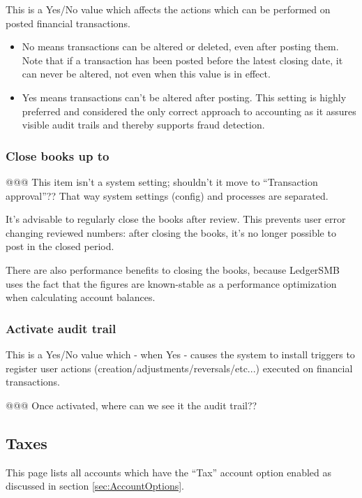 \documentclass[10pt,A4]{book}
\begin{document}
This is a Yes/No value which affects the actions which can be performed on posted financial transactions.
\begin{itemize}
\item No means transactions can be altered or deleted, even after posting them. Note that
if a transaction has been posted before the latest closing date, it can never be altered,
not even when this value is in effect.
\item Yes means transactions can't be altered after posting. This setting is highly preferred and considered the only correct approach to accounting as it assures visible
audit trails and thereby supports fraud detection.
\end{itemize}

\subsubsection{Close books up to}

@@@ This item isn't a system setting; shouldn't it move to ``Transaction approval''?? That way system settings (config) and processes are separated.

It's advisable to regularly close the books after review. This prevents user error changing
reviewed numbers: after closing the books, it's no longer possible to post in the closed
period.

There are also performance benefits to closing the books, because LedgerSMB uses the
fact that the figures are known-stable as a performance optimization when calculating
account balances.

\subsubsection{Activate audit trail}

This is a Yes/No value which - when Yes - causes the system to install triggers to register
user actions (creation/adjustments/reversals/etc...) executed on financial transactions.


@@@ Once activated, where can we see it the audit trail??


\subsection{Taxes}

This page lists all accounts which have the ``Tax'' account option enabled as discussed in section \ref{sec:AccountOptions}.
\end{document}

